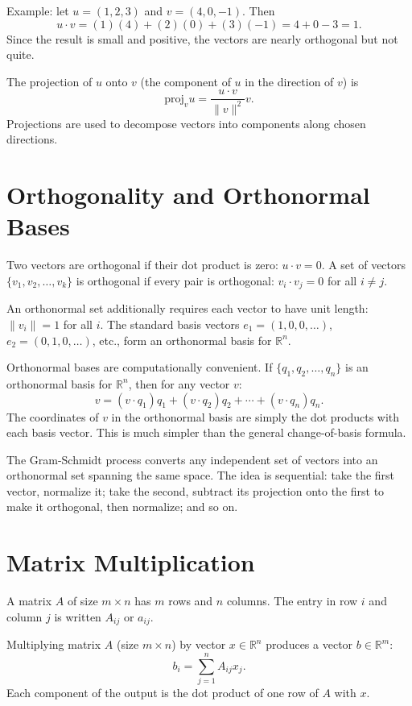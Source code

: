 \documentclass[11pt]{article}
\begin{document}
Example: let $u = (1, 2, 3)$ and $v = (4, 0, -1)$. Then
\[
u \cdot v = (1)(4) + (2)(0) + (3)(-1) = 4 + 0 - 3 = 1.
\]
Since the result is small and positive, the vectors are nearly orthogonal but not quite.

The projection of $u$ onto $v$ (the component of $u$ in the direction of $v$) is
\[
\text{proj}_v u = \frac{u \cdot v}{\|v\|^2} v.
\]
Projections are used to decompose vectors into components along chosen directions.

\section*{Orthogonality and Orthonormal Bases}

Two vectors are orthogonal if their dot product is zero: $u \cdot v = 0$. A set of vectors $\{v_1, v_2, \ldots, v_k\}$ is orthogonal if every pair is orthogonal: $v_i \cdot v_j = 0$ for all $i \neq j$.

An orthonormal set additionally requires each vector to have unit length: $\|v_i\| = 1$ for all $i$. The standard basis vectors $e_1 = (1,0,0,\ldots)$, $e_2 = (0,1,0,\ldots)$, etc., form an orthonormal basis for $\mathbb{R}^n$.

Orthonormal bases are computationally convenient. If $\{q_1, q_2, \ldots, q_n\}$ is an orthonormal basis for $\mathbb{R}^n$, then for any vector $v$:
\[
v = (v \cdot q_1) q_1 + (v \cdot q_2) q_2 + \cdots + (v \cdot q_n) q_n.
\]
The coordinates of $v$ in the orthonormal basis are simply the dot products with each basis vector. This is much simpler than the general change-of-basis formula.

The Gram-Schmidt process converts any independent set of vectors into an orthonormal set spanning the same space. The idea is sequential: take the first vector, normalize it; take the second, subtract its projection onto the first to make it orthogonal, then normalize; and so on.

\section*{Matrix Multiplication}

A matrix $A$ of size $m \times n$ has $m$ rows and $n$ columns. The entry in row $i$ and column $j$ is written $A_{ij}$ or $a_{ij}$.

Multiplying matrix $A$ (size $m \times n$) by vector $x \in \mathbb{R}^n$ produces a vector $b \in \mathbb{R}^m$:
\[
b_i = \sum_{j=1}^n A_{ij} x_j.
\]
Each component of the output is the dot product of one row of $A$ with $x$.
\end{document}
